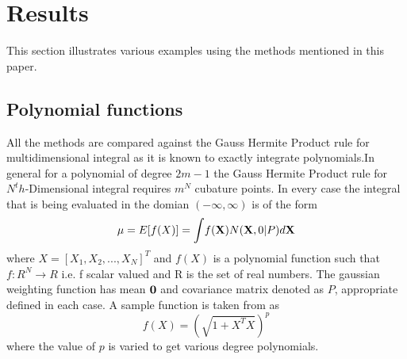 \documentclass[letterpaper, 10 pt, conference]{ieeeconf}  %
\newcommand{\comments}[1]{}
\begin{document}
  \comments{
\begin{table}
\caption{Solution for 5D-8th moment constraint equations}
\label{8mom5Dsol}
\begin{center}
\begin{tabular}{|c||c|}
\hline
$h=3$   		 &  	 	$r_1=2.3143708172807447$ 			 					 \\
\hline
$r_2=0.8390942773980102 $ 		   & 			$r_3=1.8307521253266494$  						\\
\hline 
$r_4=1.3970397430644959$ 		 & 			$r_5=2 $  										\\
\hline
$r_6=1.1134786327367021$ 		 &	  	$w_1 = 0.010529034221546607 $  										\\
\hline
$w_2 = 0.015144019639537572$ 		 & 			$ w_3 = 0.0052828996967816825$  													\\
\hline
$w_4=0.0010671298950159158$ 		 & 			$w_5=0.0006510416666666666 $  									\\
\hline
$w_6 = 0.00013776017592074394$                                 &   \\
\hline
\end{tabular}
\end{center}
\end{table}
}

\section{Results}
This section illustrates various examples using the methods mentioned in this paper. 

\subsection{Polynomial functions}
All the methods are compared against the Gauss Hermite Product rule for multidimensional integral as it is known to exactly integrate polynomials.In general for a polynomial of degree $2m-1$ the Gauss Hermite Product rule for $N^th$-Dimensional integral requires $m^N$ cubature points. In every case the integral that is being evaluated in the domian $(-\infty,\infty)$ is of the form
\begin{equation}
\mu=E[f(X)]={\bf \int}{{f({\bf X})N({\bf X},0|P)}}d{\bf X}
\end{equation}
where $X=[X_1,X_2,...,X_N]^T$ and $f(X)$ is a polynomial function such that $f:R^N \rightarrow R$ i.e. f scalar valued and R is the set of real numbers. The gaussian weighting function has mean ${\bf 0}$ and covariance matrix denoted as $P$, appropriate defined in each case. A sample function is taken from \cite{c9} as
\begin{equation}
f(X)=(\sqrt{1+X^TX})^p\label{ckfegcrazy}
\end{equation}
where the value of $p$ is varied to get various degree polynomials.
\end{document}
